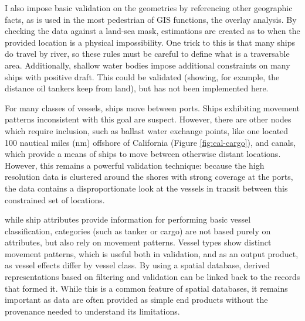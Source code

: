 I also impose basic validation on the geometries by referencing other geographic facts, as is used in the most pedestrian of GIS functions, the overlay analysis. By checking the data against a land-sea mask, estimations are created as to when the provided location is a physical impossibility. One trick to this is that many ships do travel by river, so these rules must be careful to define what is a traversable area. Additionally, shallow water bodies impose additional constraints on many ships with positive draft. This could be validated (showing, for example, the distance oil tankers keep from land), but has not been implemented here.

For many classes of vessels, ships move between ports. Ships exhibiting movement patterns inconsistent with this goal are suspect. %
However, there are other nodes which require inclusion, such as ballast water exchange points, like one located 100 nautical miles (nm) offshore of California (Figure \ref{fig:cal-cargo}), and canals, which provide a means of ships to move between otherwise distant locations. However, this remains a powerful validation technique: because the high resolution data is clustered around the shores with strong coverage at the ports, the data contains a disproportionate look at the vessels in transit between this constrained set of locations.



while ship attributes provide information for performing basic vessel classification, categories (such as tanker or cargo) are not based purely on attributes, but also rely on movement patterns. Vessel types show distinct movement patterns, which is useful both in validation, and as an output product, as vessel effects differ by vessel class. By using a spatial database, derived representations based on filtering and validation can be linked back to the records that formed it. While this is a common feature of spatial databases, it remains important as data are often provided as simple end products without the provenance needed to understand its limitations.


